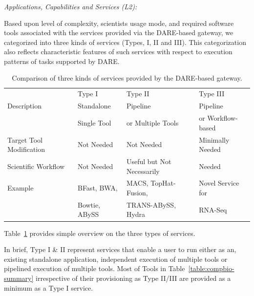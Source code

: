\documentclass[]{article}
\begin{document}

\textit{Applications, Capabilities and Services (L2):}

Based upon level of complexity, scientists usage mode,
and required software tools associated with the services provided via the DARE-based gateway, we categorized into three kinds of services (Types, I, II and III).  This categorization also reflects characteristic features of such services with respect to execution patterns of tasks supported by DARE.

\begin{table}[!h]
\begin{center}
 \caption{Comparison of three kinds of services provided by the DARE-based gateway. }

\begin{tabular}{| l | l | l | l |} \hline \rowcolor[rgb]{0.8,0.8,0.8} &
Type I & Type II & Type III \\ Description & Standalone  & Pipeline & Pipeline \\ 
& Single Tool  & or Multiple Tools &  or Workflow-based \\\hline 
Target Tool Modification & Not Needed &
Not Needed & Minimally Needed \\ \hline Scientific Workflow & Not Needed & Useful but Not Necessarily &
Needed \\ \hline 
Example & BFast, BWA,  & MACS, TopHat-Fusion,  &   Novel Service for 
 \\
 &  Bowtie, ABySS  & TRANS-ABySS, Hydra & RNA-Seq \\
\hline
\end{tabular}
\label{table:three-type-service}
\end{center}
\end{table}

Table~\ref{table:three-type-service} provides simple overview on the three types of services.

In brief, Type I \& II represent services that enable a user to run either as an, existing standalone
application, independent execution of multiple tools or pipelined
execution of multiple tools.  Most of Tools in
Table~\ref{table:compbio-summary} irrespective of their provisioning
as Type II/III are provided as a minimum as a Type I service.
\end{document}
